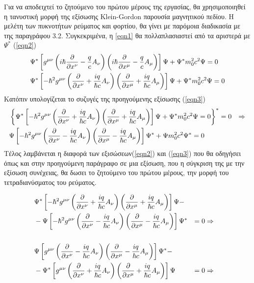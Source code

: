 Για να αποδειχτεί το ζητούμενο του πρώτου μέρους της εργασίας, θα χρησιμοποιηθεί η τανυστική μορφή της εξίσωσης \textlatin{Klein-Gordon} παρουσία μαγνητικού πεδίου. H μελέτη των πυκνοτήτων ρεύματος και φορτίου, θα γίνει με  παρόμοια  διαδικασία  με της παραγράφου 3.2. Συγκεκριμένα, η \ref{eqn1} θα πολλαπλασιαστεί από τα αριστερά με $\Psi^*$ (\ref{eqn2}) 
\begin{align}
  \notag &\Psi^* \left[  g^{\mu\nu} \left(  i \hbar\frac{\partial }{\partial x^\nu}-\frac{q}{c}A_\nu \right)  \left(  i \hbar\frac{\partial }{\partial x^\mu}-\frac{q}{c}A_\mu \right) \right]  \Psi + \Psi^* m_0^2 c^2 \Psi=0 
  \\&\Psi^* \left[  -\hbar^2 g^{\mu\nu} \left(  \frac{\partial }{\partial x^\nu}+\frac{iq}{\hbar c}A_\nu \right)  \left(  \frac{\partial }{\partial x^\mu}+\frac{iq}{\hbar c}A_\mu \right) \right]  \Psi + \Psi^* m_0^2 c^2 \Psi=0 
  \label{eqn2}
\end{align}
Κατόπιν υπολογίζεται το συζυγές της προηγούμενης εξίσωσης (\ref{eqn3})
\begin{align}
  \notag  &\left\{ \Psi^* \left[  -\hbar^2 g^{\mu\nu} \left(  \frac{\partial }{\partial x^\nu}+\frac{iq}{\hbar c}A_\nu \right)  \left(  \frac{\partial }{\partial x^\mu}+\frac{iq}{\hbar c}A_\mu \right) \right]  \Psi + \Psi^* m_0^2 c^2 \Psi=0  \right\} ^*=0 &\Rightarrow
  \\ &\Psi \left[  -\hbar^2 g^{\mu\nu} \left(  \frac{\partial }{\partial x^\nu}-\frac{iq}{\hbar c}A_\nu \right)  \left(  \frac{\partial }{\partial x^\mu}-\frac{iq}{\hbar c}A_\mu \right) \right]  \Psi^* + \Psi m_0^2 c^2 \Psi^*=0 
  \label{eqn3}
\end{align}
Τέλος λαμβάνεται η διαφορά των εξισώσεων(\ref{eqn2}) και (\ref{eqn3}) που θα οδηγήσει όπως και στην προηγούμενη παράγραφο σε μια εξίσωση, που η σύγκριση της με την εξίσωση συνέχειας, θα δωσει το ζητούμενο του πρώτου μέρους, την μορφή του τετραδιανύσματος του ρεύματος. 


\begin{align*}
  &\Psi^* \left[  -\hbar^2 g^{\mu\nu} \left(  \frac{\partial }{\partial x^\nu}+\frac{iq}{\hbar c}A_\nu \right)  \left(  \frac{\partial }{\partial x^\mu}+\frac{iq}{\hbar c}A_\mu \right) \right]  \Psi- 
  \\ &-\Psi \left[  -\hbar^2 g^{\mu\nu} \left(  \frac{\partial }{\partial x^\nu}-\frac{iq}{\hbar c}A_\nu \right)  \left(  \frac{\partial }{\partial x^\mu}-\frac{iq}{\hbar c}A_\mu \right) \right]  \Psi^* &=0 &\Rightarrow
  \\
  \\ &\Psi \left[  g^{\mu\nu} \left(  \frac{\partial }{\partial x^\nu}-\frac{iq}{\hbar c}A_\nu \right)  \left(  \frac{\partial }{\partial x^\mu}-\frac{iq}{\hbar c}A_\mu \right) \right]  \Psi^*- 
  \\ & -\Psi^* \left[  g^{\mu\nu} \left(  \frac{\partial }{\partial x^\nu}+\frac{iq}{\hbar c}A_\nu \right)  \left(  \frac{\partial }{\partial x^\mu}+\frac{iq}{\hbar c}A_\mu \right) \right]  \Psi &=0 &\Rightarrow
\end{align*}

